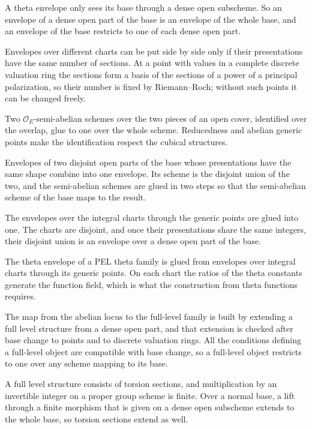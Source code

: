 A theta envelope only sees its base through a dense open subscheme. So an envelope of a dense open part of the base is
an envelope of the whole base, and an envelope of the base restricts to one of each dense open part.

Envelopes over different charts can be put side by side only if their presentations have the same number of sections.
At a point with values in a complete discrete valuation ring the sections form a basis of the sections of a power of a
principal polarization, so their number is fixed by Riemann--Roch; without such points it can be changed freely.

Two $\mathcal O_E$-semi-abelian schemes over the two pieces of an open cover, identified over the overlap, glue to one
over the whole scheme. Reducedness and abelian generic points make the identification respect the cubical structures.

Envelopes of two disjoint open parts of the base whose presentations have the same shape combine into one envelope.
Its scheme is the disjoint union of the two, and the semi-abelian schemes are glued in two steps so that the
semi-abelian scheme of the base maps to the result.

The envelopes over the integral charts through the generic points are glued into one. The charts are
disjoint, and once their presentations share the same integers, their disjoint union is an envelope over
a dense open part of the base.

The theta envelope of a PEL theta family is glued from envelopes over integral charts through its
generic points. On each chart the ratios of the theta constants generate the function field, which is
what the construction from theta functions requires.

The map from the abelian locus to the full-level family is built by extending a full level structure
from a dense open part, and that extension is checked after base change to points and to discrete
valuation rings. All the conditions defining a full-level object are compatible with base change, so a
full-level object restricts to one over any scheme mapping to its base.

A full level structure consists of torsion sections, and multiplication by an invertible integer on a
proper group scheme is finite. Over a normal base, a lift through a finite morphism that is given on a
dense open subscheme extends to the whole base, so torsion sections extend as well.

